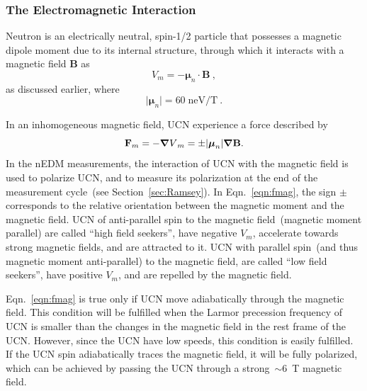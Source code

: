 \subsubsection{The Electromagnetic Interaction}

Neutron is an electrically neutral, spin-1/2 particle that possesses a
magnetic dipole moment due to its internal structure, through which it
interacts with a magnetic field \textbf{B} as
\begin{equation}
  \label{eqn:vmag}
V_m=-\boldsymbol{\mu}_n \cdot \textbf{B}~,
\end{equation}
as discussed earlier, where
\begin{equation}
\vert \boldsymbol{\mu}_n \vert =60 \; \text{neV/T}~.
\end{equation}

In an inhomogeneous magnetic field, UCN experience a force described
by
\begin{equation}
  \label{eqn:fmag}
  {\bf{F}}_m = - {\boldsymbol{\nabla}V}_m = \pm \vert {\boldsymbol{\mu}}_n \vert \boldsymbol{\nabla} \bf{B}.
\end{equation}
In the nEDM measurements, the interaction of UCN with the magnetic
field is used to polarize UCN, and to measure its polarization at the
end of the measurement cycle~(see Section~\ref{sec:Ramsey}). In
Eqn.~\ref{eqn:fmag}, the sign $\pm$ corresponds to the relative
orientation between the magnetic moment and the magnetic field.  UCN
of anti-parallel spin to the magnetic field~(magnetic moment parallel)
are called ``high field seekers'', have negative $V_m$, accelerate
towards strong magnetic fields, and are attracted to it. UCN with
parallel spin~(and thus magnetic moment anti-parallel) to the magnetic
field, are called ``low field seekers'', have positive $V_m$, and
are repelled by the magnetic field.

Eqn.~\ref{eqn:fmag} is true only if UCN move adiabatically through the
magnetic field. This condition will be fulfilled when the Larmor
precession frequency of UCN is smaller than the changes in the
magnetic field in the rest frame of the UCN. However, since the UCN
have low speeds, this condition is easily fulfilled. If the UCN spin
adiabatically traces the magnetic field, it will be fully polarized,
which can be achieved by passing the UCN through a strong~$\sim 6$~T
magnetic field.


